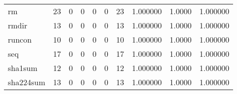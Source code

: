 \begin{tabular}{lrrrrrrrrr}
rm        &                                       23 &                                                  0 &                                                  0 &                                                  0 &                                                  0 &                                                 23 &                                           1.000000 &                                 1.0000 &                             1.000000 \\
rmdir     &                                       13 &                                                  0 &                                                  0 &                                                  0 &                                                  0 &                                                 13 &                                           1.000000 &                                 1.0000 &                             1.000000 \\
runcon    &                                       10 &                                                  0 &                                                  0 &                                                  0 &                                                  0 &                                                 10 &                                           1.000000 &                                 1.0000 &                             1.000000 \\
seq       &                                       17 &                                                  0 &                                                  0 &                                                  0 &                                                  0 &                                                 17 &                                           1.000000 &                                 1.0000 &                             1.000000 \\
sha1sum   &                                       12 &                                                  0 &                                                  0 &                                                  0 &                                                  0 &                                                 12 &                                           1.000000 &                                 1.0000 &                             1.000000 \\
sha224sum &                                       13 &                                                  0 &                                                  0 &                                                  0 &                                                  0 &                                                 13 &                                           1.000000 &                                 1.0000 &                             1.000000 \\

\end{tabular}

